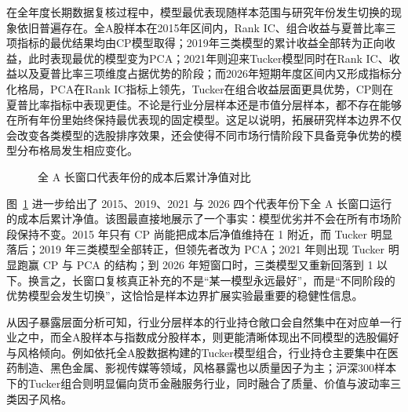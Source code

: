 在全年度长期数据复核过程中，模型最优表现随样本范围与研究年份发生切换的现象依旧普遍存在。全A股样本在2015年区间内，Rank IC、组合收益与夏普比率三项指标的最优结果均由CP模型取得；2019年三类模型的累计收益全部转为正向收益，此时表现最优的模型变为PCA；2021年则迎来Tucker模型同时在Rank IC、收益以及夏普比率三项维度占据优势的阶段；而2026年短期年度区间内又形成指标分化格局，PCA在Rank IC指标上领先，Tucker在组合收益层面更具优势，CP则在夏普比率指标中表现更佳。不论是行业分层样本还是市值分层样本，都不存在能够在所有年份里始终保持最优表现的固定模型。这足以说明，拓展研究样本边界不仅会改变各类模型的选股排序效果，还会使得不同市场行情阶段下具备竞争优势的模型分布格局发生相应变化。

\begin{figure}[!t]
\centering
{}
\caption{全 A 长窗口代表年份的成本后累计净值对比}
\label{fig:all_a_long_window_cost}
\end{figure}

图~\ref{fig:all_a_long_window_cost} 进一步给出了 2015、2019、2021 与 2026 四个代表年份下全 A 长窗口运行的成本后累计净值。该图最直接地展示了一个事实：模型优劣并不会在所有市场阶段保持不变。2015 年只有 CP 尚能把成本后净值维持在 1 附近，而 Tucker 明显落后；2019 年三类模型全部转正，但领先者改为 PCA；2021 年则出现 Tucker 明显跑赢 CP 与 PCA 的结构；到 2026 年短窗口时，三类模型又重新回落到 1 以下。换言之，长窗口复核真正补充的不是“某一模型永远最好”，而是“不同阶段的优势模型会发生切换”，这恰恰是样本边界扩展实验最重要的稳健性信息。

从因子暴露层面分析可知，行业分层样本的行业持仓敞口会自然集中在对应单一行业之中，而全A股样本与指数成分股样本，则更能清晰体现出不同模型的选股偏好与风格倾向。例如依托全A股数据构建的Tucker模型组合，行业持仓主要集中在医药制造、黑色金属、影视传媒等领域，风格暴露也以质量因子为主；沪深300样本下的Tucker组合则明显偏向货币金融服务行业，同时融合了质量、价值与波动率三类因子风格。

